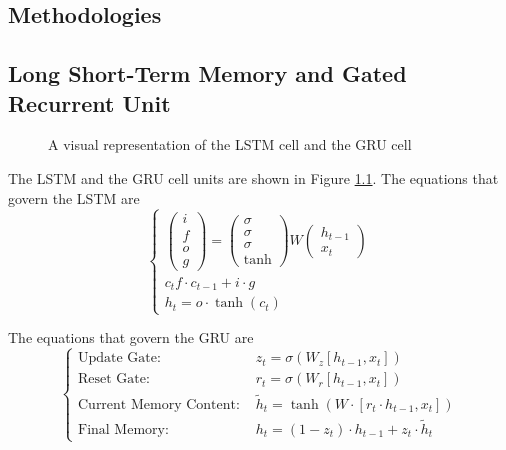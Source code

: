 \begin{appendices}
\chapter{Methodologies}
\section{Long Short-Term Memory and Gated Recurrent Unit}
\label{app:LSTM_GRU}

\begin{center}
\begin{figure}[H]
    \caption{A visual representation of the LSTM cell and the GRU cell}
    \label{app::LSTM_GRU}
\end{figure}
\end{center}

The LSTM and the GRU cell units are shown in Figure \ref{app::LSTM_GRU}. The equations that govern the LSTM are
\begin{equation*}
\begin{cases}
\begin{pmatrix} i \\ f \\ o \\ g \end{pmatrix} = \begin{pmatrix} \sigma \\ \sigma \\ \sigma \\ \tanh \end{pmatrix} W \begin{pmatrix} h_{t-1} \\ x_t \end{pmatrix} \\
c_t f \cdot c_{t-1} + i \cdot g \\
h_t = o \cdot \tanh(c_t)
\end{cases}
\end{equation*}

The equations that govern the GRU are
\begin{equation*}
\begin{cases}
\text{Update Gate: } &  z_t = \sigma(W_z [h_{t-1},x_t]) \\
\text{Reset Gate: } & r_t = \sigma(W_r[h_{t-1},x_t]) \\
\text{Current Memory Content: } & \tilde{h}_t = \tanh(W \cdot [r_t \cdot h_{t-1}, x_t]) \\
\text{Final Memory: } & h_t = (1-z_t) \cdot h_{t-1} + z_t \cdot \tilde{h}_t
\end{cases}
\end{equation*}


\end{appendices}
